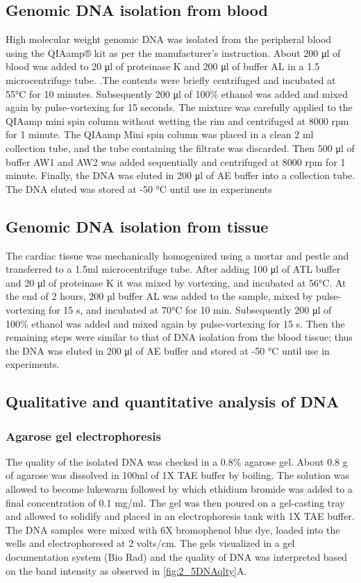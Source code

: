 \subsection{Genomic DNA isolation from blood}
High molecular weight genomic DNA was isolated from the peripheral blood using the QIAamp® kit as per the manufacturer’s instruction. About 200 μl of blood was added to 20 μl of proteinase K and 200 μl of buffer AL in a 1.5 microcentrifuge tube. .The contents were briefly centrifuged and incubated at 55°C for 10 minutes. Subsequently 200 μl of 100\% ethanol was added and mixed again by pulse-vortexing for 15 seconds. The mixture was carefully applied to the QIAamp mini spin column without wetting the rim and centrifuged at 8000 rpm for 1 minute. The QIAamp Mini spin column was placed in a clean 2 ml collection tube, and the tube containing the filtrate was discarded. Then 500 μl of buffer AW1 and AW2 was added sequentially and centrifuged at 8000 rpm for 1 minute. Finally, the DNA was eluted in 200 μl of AE buffer into a collection tube. The DNA eluted was stored at -50 °C until use in experiments
 
\subsection{Genomic DNA isolation from tissue}
The cardiac tissue was mechanically homogenized using a mortar and pestle and transferred to a 1.5ml microcentrifuge tube. After adding 100 μl of ATL buffer and 20 μl of proteinase K it was mixed by vortexing, and incubated at 56°C. At the end of 2 hours, 200 µl buffer AL was added to the sample, mixed by pulse-vortexing for 15 s, and incubated at 70°C for 10 min. Subsequently 200 μl of 100\% ethanol was added and mixed again by pulse-vortexing for 15 s. Then the remaining steps were similar to that of DNA isolation from the blood tissue; thus the DNA was eluted in 200 μl of AE buffer and stored at -50 °C until use in experiments. 
\subsection{Qualitative and quantitative analysis of DNA}
\subsubsection{Agarose gel electrophoresis}
The quality of the isolated DNA was checked in a 0.8\% agarose gel. About 0.8 g of agarose was dissolved in 100ml of 1X TAE buffer by boiling. The solution was allowed to become lukewarm followed by which ethidium bromide was added to a final concentration of 0.1 mg/ml. The gel was then poured on a gel-casting tray and allowed to solidify and placed in an electrophoresis tank with 1X TAE buffer. The DNA samples were mixed with 6X bromophenol blue dye, loaded into the wells and electrophoresed at 2 volts/cm. The gels visualized in a gel documentation system (Bio Rad) and the quality of DNA was interpreted based on the band intensity as observed in \cref{fig:2_5DNAqlty}A.
